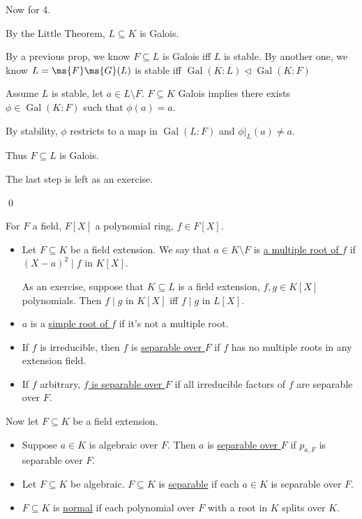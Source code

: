 \documentclass[x11names,reqno,14pt]{extarticle}
\DeclareMathOperator{\Gal}{Gal}
\begin{document}
Now for 4. 

By the Little Theorem, $L \subseteq K$ is Galois. 

By a previous prop, we know $F \subseteq L$ is Galois iff $L$ is stable. 
By another one, we know $L = \ms{F}\ms{G}(L)$ is stable iff $\Gal(K:L) \underline{\lhd} \Gal(K:F)$

Assume $L$ is stable, let $a \in L \setminus F$. $F \subseteq K$ Galois implies there exists $\phi \in \Gal(K:F)$ such that $\phi(a) = a$. 

By stability, $\phi$ restricts to a map in $\Gal(L:F)$ and $\phi|_L(a) \neq a$. 

Thus $F \subseteq L$ is Galois. 

The last step is left as an exercise. 

\qed


For $F$ a field, $F[X]$ a polynomial ring, $f \in F[X]$. 

\begin{itemize} 

\item Let $F \subseteq K$ be a field extension. We say that $a \in K \setminus F$ is \underline{a multiple root of $f$} if $(X - a)^2 \mid f$ in $K[X]$.

As an exercise, suppose that $K \subseteq L$ is a field extension, $f, g \in K[X]$ polynomials. Then $f\mid g$ in $K[X]$ iff $f\mid g$ in $L[X]$. 

\item $a$ is a \underline{simple root of $f$} if it's not a multiple root. 

\item If $f$ is irreducible, then $f$ is \underline{separable over $F$} if $f$ has no multiple roots in any extension field. 

\item If $f$ arbitrary, \underline{$f$ is separable over $F$} if all irreducible factors of $f$ are separable over $F$. 

\end{itemize}

Now let $F \subseteq K$ be a field extension. 

\begin{itemize}

\item Suppose $a \in K$ is algebraic over $F$. Then $a$ is \underline{separable over $F$} if $p_{a, F}$ is separable over $F$. 

\item Let $F \subseteq K$ be algebraic. $F \subseteq K$ is \underline{separable} if each $a \in K$ is separable over $F$. 

\item $F \subseteq K$ is \underline{normal} if each polynomial over $F$ with a root in $K$ splits over $K$. 

\end{itemize}
\end{document}
